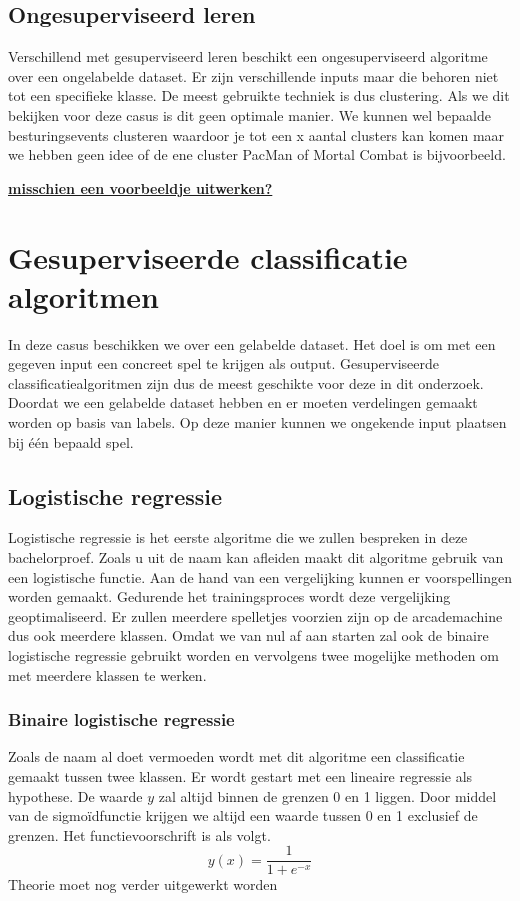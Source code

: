 \subsection*{Ongesuperviseerd leren}
\label{sec: ongesuperviseerd-leren}
Verschillend met gesuperviseerd leren beschikt een ongesuperviseerd algoritme over een ongelabelde dataset. Er zijn verschillende inputs maar die behoren niet tot een specifieke klasse. De meest gebruikte techniek is dus clustering. Als we dit bekijken voor deze casus is dit geen optimale manier. We kunnen wel bepaalde besturingsevents clusteren waardoor je tot een x aantal clusters kan komen maar we hebben geen idee of de ene cluster PacMan of Mortal Combat is bijvoorbeeld. 


\textbf{\underline{{\Large misschien een voorbeeldje uitwerken? }}}

\section{Gesuperviseerde classificatie algoritmen}
\label{sec:gesuperviseerde-classificatie-algoritmen}

In deze casus beschikken we over een gelabelde dataset. Het doel is om met een gegeven input een concreet spel te krijgen als output. Gesuperviseerde classificatiealgoritmen zijn dus de meest geschikte voor deze in dit onderzoek. Doordat we een gelabelde dataset hebben en er moeten verdelingen gemaakt worden op basis van labels. Op deze manier kunnen we ongekende input plaatsen bij één bepaald spel.




\subsection{Logistische regressie}
\label{sec:logistische-regressie}

Logistische regressie is het eerste algoritme die we zullen bespreken in deze bachelorproef. Zoals u uit de naam kan afleiden maakt dit algoritme gebruik van een logistische functie. Aan de hand van een vergelijking kunnen er voorspellingen worden gemaakt. Gedurende het trainingsproces wordt deze vergelijking geoptimaliseerd. Er zullen meerdere spelletjes voorzien zijn op de arcademachine dus ook meerdere klassen. Omdat we van nul af aan starten zal ook de binaire logistische regressie gebruikt worden en vervolgens twee mogelijke methoden om met meerdere klassen te werken. 

\subsubsection{Binaire logistische regressie}
\label{sec:Binaire-logistische-regressie}
Zoals de naam al doet vermoeden wordt met dit algoritme een classificatie gemaakt tussen twee klassen. 
Er wordt gestart met een lineaire regressie als hypothese. De waarde $y$ zal altijd binnen de grenzen 0 en 1 liggen.  Door middel van de sigmoïdfunctie krijgen we altijd een waarde tussen 0 en 1 exclusief de grenzen. Het functievoorschrift is als volgt. 
$$
y(x) = {\frac{1}{1+e^{-x}}}
$$
Theorie moet nog verder uitgewerkt worden





